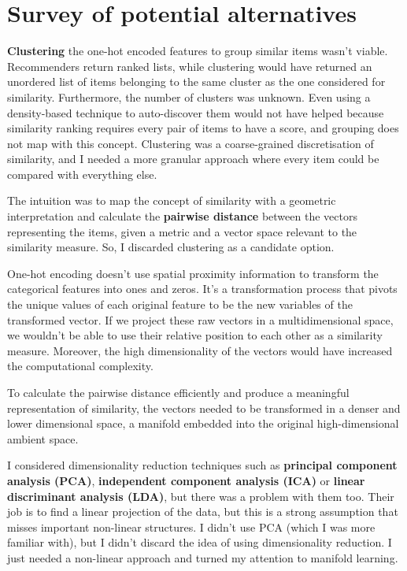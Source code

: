 
\section{Survey of potential alternatives}

\textbf{Clustering} the one-hot encoded features to group similar items wasn't viable.
Recommenders return ranked lists, while clustering would have returned an unordered list of items
belonging to the same cluster as the one considered for similarity.
Furthermore, the number of clusters was unknown.
Even using a density-based technique to auto-discover them would not have helped
because similarity ranking requires every pair of items to have a score,
and grouping does not map with this concept.
Clustering was a coarse-grained discretisation of similarity,
and I needed a more granular approach where every item could be compared with everything else.

The intuition was to map the concept of similarity with a geometric interpretation
and calculate the \textbf{pairwise distance} between the vectors representing the items,
given a metric and a vector space relevant to the similarity measure.
So, I discarded clustering as a candidate option.

One-hot encoding doesn't use spatial proximity information to transform the categorical features into ones and zeros.
It's a transformation process that pivots the unique values of each original feature to be the new variables of the transformed vector.
If we project these raw vectors in a multidimensional space, we wouldn't be able to use their
relative position to each other as a similarity measure. Moreover, the high dimensionality of the vectors would have increased
the computational complexity.

To calculate the pairwise distance efficiently and produce a meaningful representation of similarity,
the vectors needed to be transformed in a denser and lower dimensional space,
a manifold embedded into the original high-dimensional ambient space.

I considered dimensionality reduction techniques such as \textbf{principal component analysis (PCA)},
\textbf{independent component analysis (ICA)} or \textbf{linear discriminant analysis (LDA)},
but there was a problem with them too.
Their job is to find a linear projection of the data,
but this is a strong assumption that misses important non-linear structures.
I didn't use PCA (which I was more familiar with),
but I didn't discard the idea of using dimensionality reduction.
I just needed a non-linear approach and turned my attention to manifold learning.

